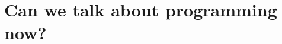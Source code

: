 \documentclass[../../../programming-introduction.tex]{subfiles}
\begin{document}
    \section{Can we talk about programming now?}
    
\end{document}
